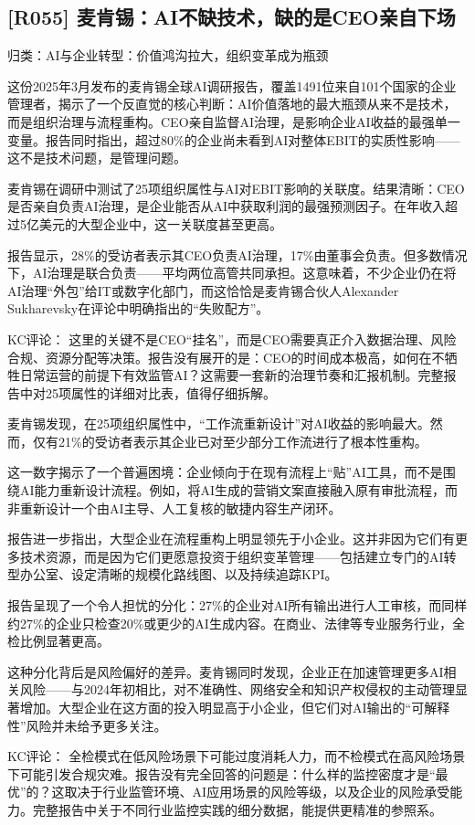 \documentclass[11pt]{ctexart}
\begin{document}
\subsection{[R055] 麦肯锡：AI不缺技术，缺的是CEO亲自下场}
{\small\color{refgray}归类：AI与企业转型：价值鸿沟拉大，组织变革成为瓶颈}

这份2025年3月发布的麦肯锡全球AI调研报告，覆盖1491位来自101个国家的企业管理者，揭示了一个反直觉的核心判断：AI价值落地的最大瓶颈从来不是技术，而是组织治理与流程重构。CEO亲自监督AI治理，是影响企业AI收益的最强单一变量。报告同时指出，超过80\%的企业尚未看到AI对整体EBIT的实质性影响——这不是技术问题，是管理问题。

麦肯锡在调研中测试了25项组织属性与AI对EBIT影响的关联度。结果清晰：CEO是否亲自负责AI治理，是企业能否从AI中获取利润的最强预测因子。在年收入超过5亿美元的大型企业中，这一关联度甚至更高。

报告显示，28\%的受访者表示其CEO负责AI治理，17\%由董事会负责。但多数情况下，AI治理是联合负责——平均两位高管共同承担。这意味着，不少企业仍在将AI治理“外包”给IT或数字化部门，而这恰恰是麦肯锡合伙人Alexander Sukharevsky在评论中明确指出的“失败配方”。

KC评论： 这里的关键不是CEO“挂名”，而是CEO需要真正介入数据治理、风险合规、资源分配等决策。报告没有展开的是：CEO的时间成本极高，如何在不牺牲日常运营的前提下有效监管AI？这需要一套新的治理节奏和汇报机制。完整报告中对25项属性的详细对比表，值得仔细拆解。

麦肯锡发现，在25项组织属性中，“工作流重新设计”对AI收益的影响最大。然而，仅有21\%的受访者表示其企业已对至少部分工作流进行了根本性重构。

这一数字揭示了一个普遍困境：企业倾向于在现有流程上“贴”AI工具，而不是围绕AI能力重新设计流程。例如，将AI生成的营销文案直接融入原有审批流程，而非重新设计一个由AI主导、人工复核的敏捷内容生产闭环。

报告进一步指出，大型企业在流程重构上明显领先于小企业。这并非因为它们有更多技术资源，而是因为它们更愿意投资于组织变革管理——包括建立专门的AI转型办公室、设定清晰的规模化路线图、以及持续追踪KPI。

报告呈现了一个令人担忧的分化：27\%的企业对AI所有输出进行人工审核，而同样约27\%的企业只检查20\%或更少的AI生成内容。在商业、法律等专业服务行业，全检比例显著更高。

这种分化背后是风险偏好的差异。麦肯锡同时发现，企业正在加速管理更多AI相关风险——与2024年初相比，对不准确性、网络安全和知识产权侵权的主动管理显著增加。大型企业在这方面的投入明显高于小企业，但它们对AI输出的“可解释性”风险并未给予更多关注。

KC评论： 全检模式在低风险场景下可能过度消耗人力，而不检模式在高风险场景下可能引发合规灾难。报告没有完全回答的问题是：什么样的监控密度才是“最优”的？这取决于行业监管环境、AI应用场景的风险等级，以及企业的风险承受能力。完整报告中关于不同行业监控实践的细分数据，能提供更精准的参照系。
\end{document}
